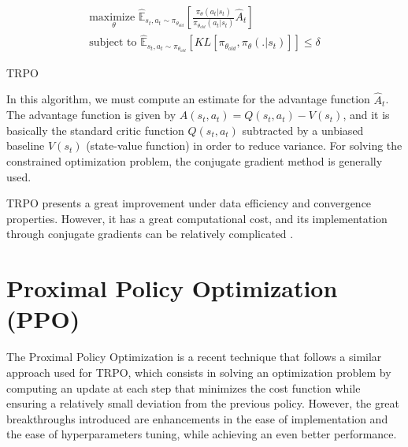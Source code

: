 
\begin{align}
\underset{\theta}{\textrm{maximize }} \mathbb{\hat{E}}_{s_t,a_t \sim \pi_{\theta_{old}} } \left[ \frac{\pi_{\theta}(a_t|s_t)}{
\pi_{\theta_{old}}(a_t|s_t)}\hat{A}_t \right]
\label{eq:TRPO_1}
\\
\textrm{subject to } \mathbb{\hat{E}}_{s_t,a_t \sim \pi_{\theta_{old}} } \left[ KL[\pi_{\theta_{old}},\pi_{\theta}(.|s_t)] \right] \leq \delta
\label{eq:TRPO_2}
\end{align}

\begin{algorithm}[H]
    \DontPrintSemicolon
    \SetAlgoLined
    \Return{$\pi_{\theta}$}
    \caption{TRPO}
    \label{algo:TRPO}
\end{algorithm}

In this algorithm, we must compute an estimate for the advantage function $\hat{A}_t$. The advantage function is given by $A(s_t,a_t) = Q(s_t,a_t) - V(s_t)$, and it is basically the standard critic function $Q(s_t,a_t)$ subtracted by a unbiased baseline $V(s_t)$ (state-value function) in order to reduce variance. For solving the constrained optimization problem, the conjugate gradient method is generally used.

TRPO presents a great improvement under data efficiency and convergence properties. However, it has a great computational cost, and its implementation through conjugate gradients can be relatively complicated \cite{PPO}.

\section{Proximal Policy Optimization (PPO)}

The Proximal Policy Optimization \cite{PPO} is a recent technique that follows a similar approach used for TRPO, which consists in solving an optimization problem by computing an update at each step that minimizes the cost function while ensuring a relatively small deviation from the previous policy. However, the great breakthroughs introduced are enhancements in the ease of implementation and the ease of hyperparameters tuning, while achieving an even better performance.

